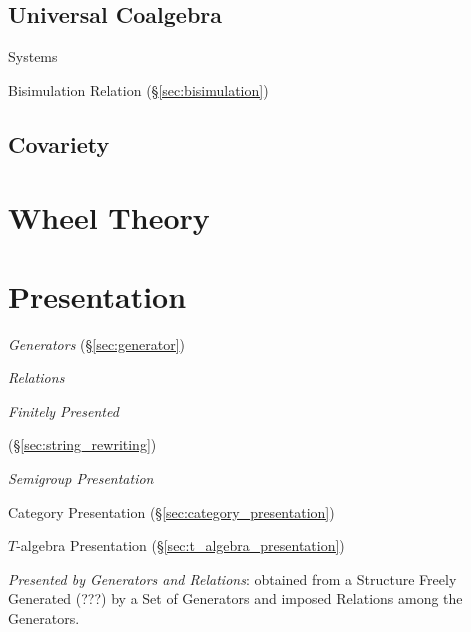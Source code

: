 \subsection{Universal Coalgebra}\label{sec:universal_coalgebra}

\cite{rutten00}

Systems

Bisimulation Relation (\S\ref{sec:bisimulation})



\subsection{Covariety}\label{sec:covariety}

\section{Wheel Theory}\label{sec:wheel_theory}




\section{Presentation}\label{sec:presentation}

\emph{Generators} (\S\ref{sec:generator})

\emph{Relations}

\emph{Finitely Presented}

(\S\ref{sec:string_rewriting})

\emph{Semigroup Presentation}

Category Presentation (\S\ref{sec:category_presentation})

$T$-algebra Presentation (\S\ref{sec:t_algebra_presentation})

\emph{Presented by Generators and Relations}: obtained from a
Structure Freely Generated (???) by a Set of Generators and imposed
Relations among the Generators.

